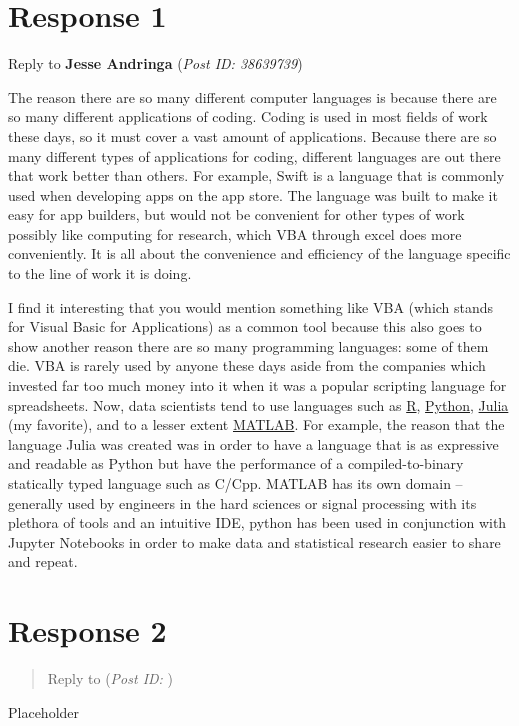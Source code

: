 \documentclass[12pt]{article}
\theoremstyle{definition}
\theoremstyle{plain}
\begin{document}
    \section{Response 1}
      \begin{mdframed}[backgroundcolor=green!20]
        Reply to \textbf{Jesse Andringa} (\textit{Post ID: 38639739})

        The reason there are so many different computer languages is because
          there are so many different applications of coding. Coding is used
          in most fields of work these days, so it must cover a vast amount
          of applications. Because there are so many different types of
          applications for coding, different languages are out there that
          work better than others. For example, Swift is a language that is
          commonly used when developing apps on the app store. The language
          was built to make it easy for app builders, but would not be
          convenient for other types of work possibly like computing for
          research, which VBA through excel does more conveniently.
          It is all about the convenience and efficiency of the language
          specific to the line of work it is doing. 
      \end{mdframed}
      I find it interesting that you would mention something like
        VBA (which stands for Visual Basic for Applications) as a
        common tool because this also goes to show another reason
        there are so many programming languages: some of them die.
        VBA is rarely used by anyone these days aside from the
        companies which invested far too much money into it when it
        was a popular scripting language for spreadsheets. Now,
        data scientists tend to use languages such as
        \href{https://www.r-project.org/}{R},
        \href{https://www.python.org/}{Python},
        \href{https://julialang.org/}{Julia} (my favorite),
        and to a lesser extent
        \href{https://www.mathworks.com/products/matlab.html}{MATLAB}. For
        example, the reason that the language Julia was created was in order to
        have a language that is as expressive and readable as Python
        but have the performance of a compiled-to-binary statically typed
        language such as C/Cpp. MATLAB has its own domain -- generally used
        by engineers in the hard sciences or signal processing with its
        plethora of tools and an intuitive IDE, python has been used in
        conjunction with Jupyter Notebooks in order to make data and statistical
        research easier to share and repeat.
        


    \section{Response 2}
      \begin{quote}
        Reply to \textbf{} (\textit{Post ID: })
      \end{quote}
      Placeholder

  \newpage
  \nocite{malik_2015}
  \printbibliography[
    heading=bibintoc,
    title={Bibliography}
  ]
\end{document}
